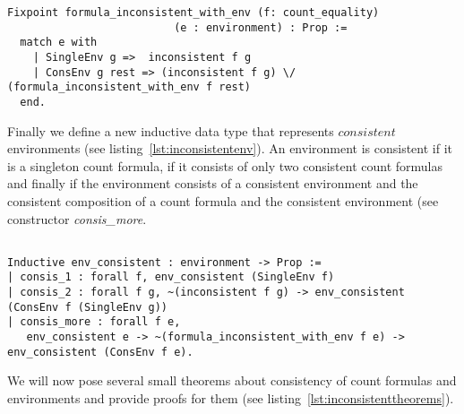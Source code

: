 \lstset{language=Coq}
\begin{lstlisting}[frame=single, caption={Inconsistent Count Formula And Environment}, label={lst:inconsistentcountandenv}]
Fixpoint formula_inconsistent_with_env (f: count_equality)
                          (e : environment) : Prop :=
  match e with
    | SingleEnv g =>  inconsistent f g
    | ConsEnv g rest => (inconsistent f g) \/ (formula_inconsistent_with_env f rest)
  end.
\end{lstlisting}

Finally we define a new inductive data type that represents $consistent$ environments (see listing~\ref{lst:inconsistentenv}). An environment is consistent if it is a singleton count formula, if it consists of only two consistent count formulas and finally if the environment consists of a consistent environment and the consistent  composition of a count formula and the consistent environment (see constructor \emph{consis_more}.

\lstset{language=Coq}
\begin{lstlisting}[frame=single, caption={Inconsistent Environment}, label={lst:inconsistentenv}]

Inductive env_consistent : environment -> Prop :=
| consis_1 : forall f, env_consistent (SingleEnv f)
| consis_2 : forall f g, ~(inconsistent f g) -> env_consistent (ConsEnv f (SingleEnv g))
| consis_more : forall f e, 
   env_consistent e -> ~(formula_inconsistent_with_env f e) -> env_consistent (ConsEnv f e).

\end{lstlisting}


We will now pose several small theorems about consistency of count formulas and environments and provide proofs for them (see listing~\ref{lst:inconsistenttheorems}).

